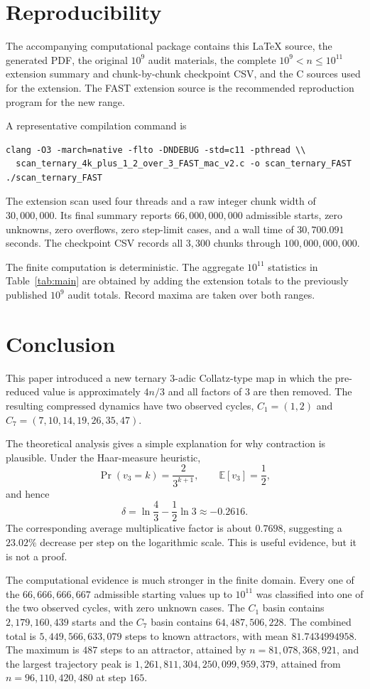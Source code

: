 \documentclass[11pt]{article}
\begin{document}
\section{Reproducibility}
The accompanying computational package contains this LaTeX source, the generated PDF, the original $10^9$ audit materials, the complete $10^9<n\le10^{11}$ extension summary and chunk-by-chunk checkpoint CSV, and the C sources used for the extension. The FAST extension source is the recommended reproduction program for the new range.

A representative compilation command is
\begin{verbatim}
clang -O3 -march=native -flto -DNDEBUG -std=c11 -pthread \\
  scan_ternary_4k_plus_1_2_over_3_FAST_mac_v2.c -o scan_ternary_FAST
./scan_ternary_FAST
\end{verbatim}
The extension scan used four threads and a raw integer chunk width of $30,000,000$. Its final summary reports $66,000,000,000$ admissible starts, zero unknowns, zero overflows, zero step-limit cases, and a wall time of $30,700.091$ seconds. The checkpoint CSV records all $3,300$ chunks through $100,000,000,000$.

The finite computation is deterministic. The aggregate $10^{11}$ statistics in Table~\ref{tab:main} are obtained by adding the extension totals to the previously published $10^9$ audit totals. Record maxima are taken over both ranges.

\section{Conclusion}
This paper introduced a new ternary $3$-adic Collatz-type map in which the pre-reduced value is approximately $4n/3$ and all factors of $3$ are then removed. The resulting compressed dynamics have two observed cycles, $C_1=(1,2)$ and $C_7=(7,10,14,19,26,35,47)$.

The theoretical analysis gives a simple explanation for why contraction is plausible. Under the Haar-measure heuristic,
\[
\Pr(v_3=k)=\frac{2}{3^{k+1}},
\qquad
\mathbb E[v_3]=\frac12,
\]
and hence
\[
\delta=\ln\frac43-\frac12\ln3\approx-0.2616.
\]
The corresponding average multiplicative factor is about $0.7698$, suggesting a $23.02\%$ decrease per step on the logarithmic scale. This is useful evidence, but it is not a proof.

The computational evidence is much stronger in the finite domain. Every one of the $66,666,666,667$ admissible starting values up to $10^{11}$ was classified into one of the two observed cycles, with zero unknown cases. The $C_1$ basin contains $2,179,160,439$ starts and the $C_7$ basin contains $64,487,506,228$. The combined total is $5,449,566,633,079$ steps to known attractors, with mean $81.7434994958$. The maximum is $487$ steps to an attractor, attained by $n=81,078,368,921$, and the largest trajectory peak is $1,261,811,304,250,099,959,379$, attained from $n=96,110,420,480$ at step $165$.
\end{document}

